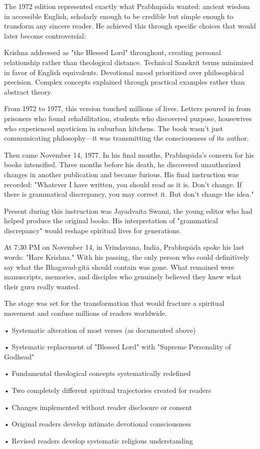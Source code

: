 \documentclass[11pt,twoside]{book}
\begin{document}
The 1972 edition represented exactly what Prabhupāda wanted: ancient wisdom in accessible English, scholarly enough to be credible but simple enough to transform any sincere reader. He achieved this through specific choices that would later become controversial:

Krishna addressed as "the Blessed Lord" throughout, creating personal relationship rather than theological distance. Technical Sanskrit terms minimized in favor of English equivalents. Devotional mood prioritized over philosophical precision. Complex concepts explained through practical examples rather than abstract theory.

From 1972 to 1977, this version touched millions of lives. Letters poured in from prisoners who found rehabilitation, students who discovered purpose, housewives who experienced mysticism in suburban kitchens. The book wasn't just communicating philosophy—it was transmitting the consciousness of its author.

Then came November 14, 1977. In his final months, Prabhupāda's concern for his books intensified. Three months before his death, he discovered unauthorized changes in another publication and became furious. His final instruction was recorded: "Whatever I have written, you should read as it is. Don't change. If there is grammatical discrepancy, you may correct it. But don't change the idea."

Present during this instruction was Jayadvaita Swami, the young editor who had helped produce the original books. His interpretation of "grammatical discrepancy" would reshape spiritual lives for generations.

At 7:30 PM on November 14, in Vrindavana, India, Prabhupāda spoke his last words: "Hare Krishna." With his passing, the only person who could definitively say what the Bhagavad-gītā should contain was gone. What remained were manuscripts, memories, and disciples who genuinely believed they knew what their guru really wanted.

The stage was set for the transformation that would fracture a spiritual movement and confuse millions of readers worldwide.

\begin{chapterfindingsbox}
• Systematic alteration of most verses (as documented above)

• Systematic replacement of "Blessed Lord" with "Supreme Personality of Godhead"

• Fundamental theological concepts systematically redefined

• Two completely different spiritual trajectories created for readers

• Changes implemented without reader disclosure or consent

• Original readers develop intimate devotional consciousness

• Revised readers develop systematic religious understanding
\end{chapterfindingsbox}
\end{document}
